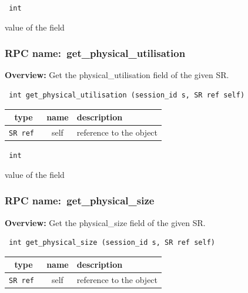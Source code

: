 \vspace{0.3cm}

{\tt 
int
}


value of the field
\vspace{0.3cm}
\vspace{0.3cm}
\vspace{0.3cm}
\subsubsection{RPC name:~get\_physical\_utilisation}

{\bf Overview:} 
Get the physical\_utilisation field of the given SR.

\begin{verbatim} int get_physical_utilisation (session_id s, SR ref self)\end{verbatim}



 
\vspace{0.3cm}
\begin{tabular}{|c|c|p{7cm}|}
 \hline
{\bf type} & {\bf name} & {\bf description} \\ \hline
{\tt SR ref } & self & reference to the object \\ \hline 

\end{tabular}

\vspace{0.3cm}

{\tt 
int
}


value of the field
\vspace{0.3cm}
\vspace{0.3cm}
\vspace{0.3cm}
\subsubsection{RPC name:~get\_physical\_size}

{\bf Overview:} 
Get the physical\_size field of the given SR.

\begin{verbatim} int get_physical_size (session_id s, SR ref self)\end{verbatim}



 
\vspace{0.3cm}
\begin{tabular}{|c|c|p{7cm}|}
 \hline
{\bf type} & {\bf name} & {\bf description} \\ \hline
{\tt SR ref } & self & reference to the object \\ \hline 

\end{tabular}


